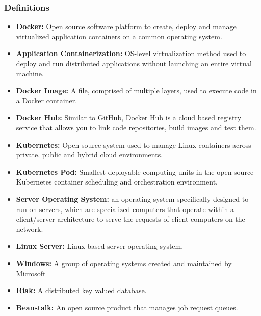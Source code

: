 \documentclass[onecolumn, draftclsnofoot,10pt, compsoc]{IEEEtran}
\begin{document}
\subsubsection{Definitions}
\begin{itemize}
    \item \textbf{Docker:} Open source software platform to create, deploy and manage virtualized application containers on a common operating system\cite{tech}.
    
\item \textbf{Application Containerization:} OS-level virtualization method used to deploy and run distributed applications without launching an entire virtual machine\cite{tech}.

\item \textbf{Docker Image:} A file, comprised of multiple layers, used to execute code in a Docker container\cite{tech}.

\item \textbf{Docker Hub:} Similar to GitHub, Docker Hub is a cloud based registry service that allows you to link code repositories, build images and test them.
    
\item \textbf{Kubernetes:} Open source system used to manage Linux containers across private, public and hybrid cloud environments\cite{tech}.



\item \textbf{Kubernetes Pod:} Smallest deployable computing units in the open source Kubernetes container scheduling and orchestration environment\cite{tech}.

\item \textbf{Server Operating System:} an operating system specifically designed to run on servers, which are specialized computers that operate within a client/server architecture to serve the requests of client computers on the network\cite{tech}.

\item \textbf{Linux Server:} Linux-based server operating system\cite{tech}.

\item \textbf{Windows:} A group of operating systems created and maintained by Microsoft

\item \textbf{Riak:} A distributed key valued database.

\item \textbf{Beanstalk:} An open source product that manages job request queues.


\end{itemize}
\end{document}
